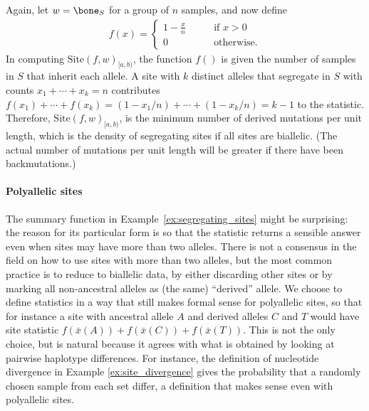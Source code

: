 \documentclass{article}
\newcommand{\site}{\mbox{Site}} %
\newcommand{\iw}{w} %
\newcommand{\aw}{{\bar x}} %
\begin{document}
\begin{example} \label{ex:segregating_sites}
    Again, let $\iw = \bone_{S}$ for a group of $n$ samples,
    and now define
    \begin{align*}
        f(x) = \begin{cases}
            1 - \frac{x}{n} \qquad &\text{if } x > 0 \\
            0 \qquad &\text{otherwise} .
        \end{cases}
    \end{align*}
    In computing $\site(f, \iw)_{[a,b)}$, the function $f()$ is given the number of samples in $S$
    that inherit each allele.
    A site with $k$ distinct alleles that segregate in $S$ with counts $x_1 + \cdots + x_k = n$
    contributes $f(x_1) + \cdots + f(x_k) = (1 - x_1/n) + \cdots + (1 - x_k/n) = k - 1$
    to the statistic. 
    Therefore, $\site(f, \iw)_{[a,b)}$, is the minimum number of derived mutations per unit length,
    which is the density of segregating sites if all sites are biallelic.
    (The actual number of mutations per unit length will be greater if there have been backmutations.)
\end{example}

\paragraph{Polyallelic sites}
The summary function in Example~\ref{ex:segregating_sites} might be surprising:
the reason for its particular form is so that the statistic returns a sensible answer
even when sites may have more than two alleles.
There is not a consensus in the field
on how to use sites with more than two alleles, but the most common practice is
to reduce to biallelic data, by either discarding other sites
or by marking all non-ancestral alleles as (the same) ``derived'' allele.
We choose to define statistics in a way that still makes formal sense for polyallelic sites,
so that for instance a site with ancestral allele $A$ and derived alleles $C$ and $T$
would have site statistic $f(\aw(A)) + f(\aw(C)) + f(\aw(T))$.
This is not the only choice, but is natural because it agrees with what is obtained by
looking at pairwise haplotype differences.
For instance, the definition of nucleotide divergence in Example \ref{ex:site_divergence}
gives the probability that a randomly chosen sample from each set differ,
a definition that makes sense even with polyallelic sites.
\end{document}
